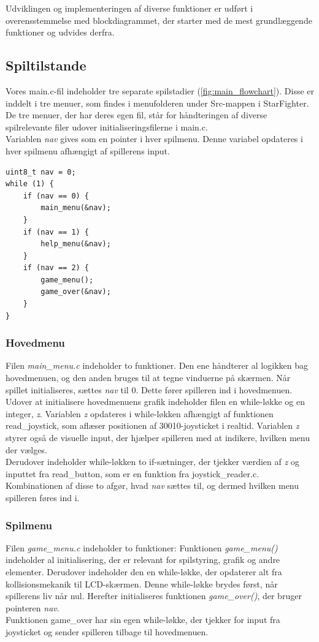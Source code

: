 Udviklingen og implementeringen af diverse funktioner er udført i overensstemmelse med blockdiagrammet, der starter med de mest grundlæggende funktioner og udvides derfra.

\subsection{Spiltilstande}
Vores main.c-fil indeholder tre separate spilstadier (\ref{fig:main_flowchart}). Disse er inddelt i tre menuer, som findes i menufolderen under Src-mappen i StarFighter. De tre menuer, der har deres egen fil, står for håndteringen af diverse spilrelevante filer udover initialiseringsfilerne i main.c.\\
Variablen \textit{nav} gives som en pointer i hver spilmenu. Denne variabel opdateres i hver spilmenu afhængigt af spillerens input.
\begin{lstlisting}[caption={Main-løkke kode}]
uint8_t nav = 0;
while (1) {
    if (nav == 0) {
        main_menu(&nav);
    }
    if (nav == 1) {
        help_menu(&nav);
    }
    if (nav == 2) {
        game_menu();
        game_over(&nav);
    }
}
\end{lstlisting}

\subsubsection{Hovedmenu}
Filen \textit{main\_menu.c} indeholder to funktioner. Den ene håndterer al logikken bag hovedmenuen, og den anden bruges til at tegne vinduerne på skærmen. Når spillet initialiseres, sættes \textit{nav} til 0. Dette fører spilleren ind i hovedmenuen.\\
Udover at initialisere hovedmenuens grafik indeholder filen en while-løkke og en integer, \textit{z}. Variablen \textit{z} opdateres i while-løkken afhængigt af funktionen read\_joystick, som aflæser positionen af 30010-joysticket i realtid. Variablen \textit{z} styrer også de visuelle input, der hjælper spilleren med at indikere, hvilken menu der vælges.\\
Derudover indeholder while-løkken to if-sætninger, der tjekker værdien af \textit{z} og inputtet fra read\_button, som er en funktion fra joystick\_reader.c. Kombinationen af disse to afgør, hvad \textit{nav} sættes til, og dermed hvilken menu spilleren føres ind i.

\subsubsection{Spilmenu}
Filen \textit{game\_menu.c} indeholder to funktioner: Funktionen \textit{game\_menu()} indeholder al initialisering, der er relevant for spilstyring, grafik og andre elementer. Derudover indeholder den en while-løkke, der opdaterer alt fra kollisionsmekanik til LCD-skærmen. Denne while-løkke brydes først, når spillerens liv når nul. Herefter initialiseres funktionen \textit{game\_over()}, der bruger pointeren \textit{nav}.\\
Funktionen game\_over har sin egen while-løkke, der tjekker for input fra joysticket og sender spilleren tilbage til hovedmenuen.

